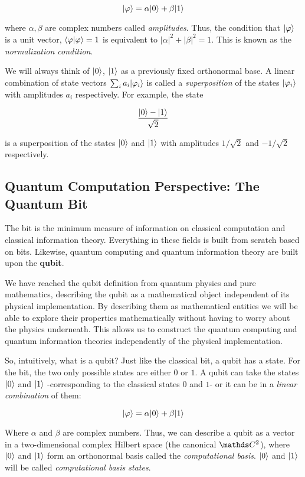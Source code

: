 $$ |\varphi\rangle = \alpha|0\rangle + \beta|1\rangle $$

where $\alpha,\beta$ are complex numbers called \emph{amplitudes}. Thus, the condition that $|\varphi\rangle$ is a unit vector, $\langle\varphi|\varphi\rangle = 1$ is equivalent to $|\alpha|^2 + |\beta|^2 = 1$. This is known as the \emph{normalization condition}.

We will always think of $|0\rangle$, $|1\rangle$ as a previously fixed orthonormal base. A linear combination of state vectors $\sum_i a_i |\varphi_i\rangle$ is called a \emph{superposition} of the states $|\varphi_i\rangle$ with amplitudes $a_i$ respectively. For example, the state

$$ \frac{|0\rangle - |1\rangle}{\sqrt 2} $$

is a superposition of the states $|0\rangle$ and $|1\rangle$ with amplitudes $1/\sqrt 2$ and $-1/\sqrt 2$ respectively.


\subsection{Quantum Computation Perspective: The Quantum Bit}


The bit is the minimum measure of information on classical computation and classical information theory. Everything in these fields is built from scratch based on bits. Likewise, quantum computing and quantum information theory are built upon the \textbf{qubit}.

We have reached the qubit definition from quantum physics and pure mathematics, describing the qubit as a mathematical object independent of its physical implementation. By describing them as mathematical entities we will be able to explore their properties mathematically without having to worry about the physics underneath.  This allows us to construct the quantum computing and quantum information theories independently of the physical implementation.

So, intuitively, what is a qubit? Just like the classical bit, a qubit has a state. For the bit, the two only possible states are either $0$ or $1$. A qubit can take the states $|0\rangle$ and $|1\rangle$ -corresponding to the classical states $0$ and $1$- or it can be in a \emph{linear combination} of them:

$$ |\varphi\rangle = \alpha |0\rangle + \beta |1\rangle $$

Where $\alpha$ and $\beta$ are complex numbers. Thus, we can describe a qubit as a vector in a two-dimensional complex Hilbert space (the canonical $\C^{2}$), where $|0\rangle$ and $|1\rangle$ form an orthonormal basis called the \emph{computational basis}. $|0\rangle$ and $|1\rangle$ will be called \emph{computational basis states}.

